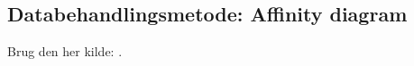 \subsection{Databehandlingsmetode: Affinity diagram}
\label{ParametreMetodeovervejelserAffinityDiagram}
%
Brug den her kilde: \textcite[ss. 24-28]{PDF:ConsolidationIdeationAffinity}.
